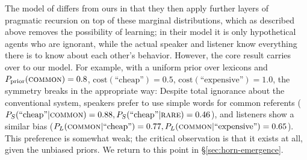 \documentclass{article} %
\begin{document}

%
%

The model of \cite{bergen2012} differs from ours in that they then
apply further layers of pragmatic recursion on top of these marginal
distributions, which as described above removes the possibility of
learning; in their model it is only hypothetical agents who are
ignorant, while the actual speaker and listener know everything there
is to know about each other's behavior. However, the core result
carries over to our model. For example, with a uniform prior over
lexicons and $P_\text{prior}(\text{\textsc{common}}) = 0.8$,
$\text{cost}(\text{``cheap''}) = 0.5$,
$\text{cost}(\text{``expensive''}) = 1.0$, the symmetry breaks in the
appropriate way: Despite total ignorance about the conventional
system, speakers prefer to use simple words for common referents
($P_S(\text{``cheap''} | \text{\textsc{common}}) = 0.88,
P_S(\text{``cheap''} | \text{\textsc{rare}}) = 0.46$), and listeners
show a similar bias ($P_L(\text{\textsc{common}} | \text{``cheap''}) =
0.77, P_L(\text{\textsc{common}} | \text{``expensive''}) =
0.65$). This preference is somewhat weak; the critical observation is
that it exists at all, given the unbiased priors. We return to this
point in \S\ref{sec:horn-emergence}.




\end{document}
